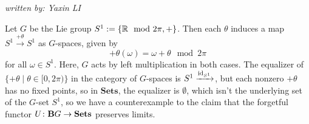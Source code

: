 \section{}
\emph{written by: Yaxin LI}

Let $G$ be the Lie group $S^1:=\left\{ \mathbb{R}\mod2\pi,+ \right\}$. Then each $\theta$ induces a map $S^1\xrightarrow{+\theta} S^1$ as $G$-spaces, given by
\[+\theta(\omega)=\omega+\theta\mod{2\pi}\]
for all $\omega\in S^1$. Here, $G$ acts by left multiplication in both cases. The equalizer of $\{+\theta\mid\theta\in[0,2\pi)\}$ in the category of $G$-spaces is $S^1\xrightarrow{\operatorname{\operatorname{id}}_{S^1}}$, but each nonzero $+\theta$ has no fixed points, so in $\textbf{Sets}$, the equalizer is $\emptyset$, which isn't the underlying set of the $G$-set $S^1$, so we have a counterexample to the claim that the forgetful functor $U\colon\textbf{B}G\rightarrow\textbf{Sets}$ preserves limits.